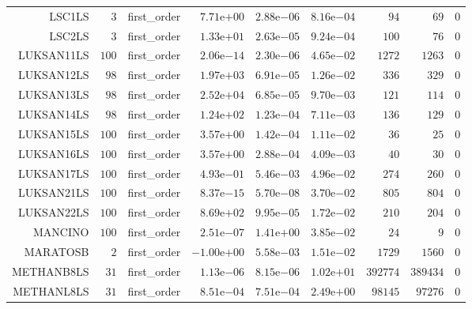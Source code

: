 \begin{longtable}{rrrrrrrrr}
LSC1LS & \(     3\) & first\_order & \( 7.71\)e\(+00\) & \( 2.88\)e\(-06\) & \( 8.16\)e\(-04\) & \(    94\) & \(    69\) & \(     0\) \\
LSC2LS & \(     3\) & first\_order & \( 1.33\)e\(+01\) & \( 2.63\)e\(-05\) & \( 9.24\)e\(-04\) & \(   100\) & \(    76\) & \(     0\) \\
LUKSAN11LS & \(   100\) & first\_order & \( 2.06\)e\(-14\) & \( 2.30\)e\(-06\) & \( 4.65\)e\(-02\) & \(  1272\) & \(  1263\) & \(     0\) \\
LUKSAN12LS & \(    98\) & first\_order & \( 1.97\)e\(+03\) & \( 6.91\)e\(-05\) & \( 1.26\)e\(-02\) & \(   336\) & \(   329\) & \(     0\) \\
LUKSAN13LS & \(    98\) & first\_order & \( 2.52\)e\(+04\) & \( 6.85\)e\(-05\) & \( 9.70\)e\(-03\) & \(   121\) & \(   114\) & \(     0\) \\
LUKSAN14LS & \(    98\) & first\_order & \( 1.24\)e\(+02\) & \( 1.23\)e\(-04\) & \( 7.11\)e\(-03\) & \(   136\) & \(   129\) & \(     0\) \\
LUKSAN15LS & \(   100\) & first\_order & \( 3.57\)e\(+00\) & \( 1.42\)e\(-04\) & \( 1.11\)e\(-02\) & \(    36\) & \(    25\) & \(     0\) \\
LUKSAN16LS & \(   100\) & first\_order & \( 3.57\)e\(+00\) & \( 2.88\)e\(-04\) & \( 4.09\)e\(-03\) & \(    40\) & \(    30\) & \(     0\) \\
LUKSAN17LS & \(   100\) & first\_order & \( 4.93\)e\(-01\) & \( 5.46\)e\(-03\) & \( 4.96\)e\(-02\) & \(   274\) & \(   260\) & \(     0\) \\
LUKSAN21LS & \(   100\) & first\_order & \( 8.37\)e\(-15\) & \( 5.70\)e\(-08\) & \( 3.70\)e\(-02\) & \(   805\) & \(   804\) & \(     0\) \\
LUKSAN22LS & \(   100\) & first\_order & \( 8.69\)e\(+02\) & \( 9.95\)e\(-05\) & \( 1.72\)e\(-02\) & \(   210\) & \(   204\) & \(     0\) \\
MANCINO & \(   100\) & first\_order & \( 2.51\)e\(-07\) & \( 1.41\)e\(+00\) & \( 3.85\)e\(-02\) & \(    24\) & \(     9\) & \(     0\) \\
MARATOSB & \(     2\) & first\_order & \(-1.00\)e\(+00\) & \( 5.58\)e\(-03\) & \( 1.51\)e\(-02\) & \(  1729\) & \(  1560\) & \(     0\) \\
METHANB8LS & \(    31\) & first\_order & \( 1.13\)e\(-06\) & \( 8.15\)e\(-06\) & \( 1.02\)e\(+01\) & \(392774\) & \(389434\) & \(     0\) \\
METHANL8LS & \(    31\) & first\_order & \( 8.51\)e\(-04\) & \( 7.51\)e\(-04\) & \( 2.49\)e\(+00\) & \( 98145\) & \( 97276\) & \(     0\) \\

\end{longtable}
